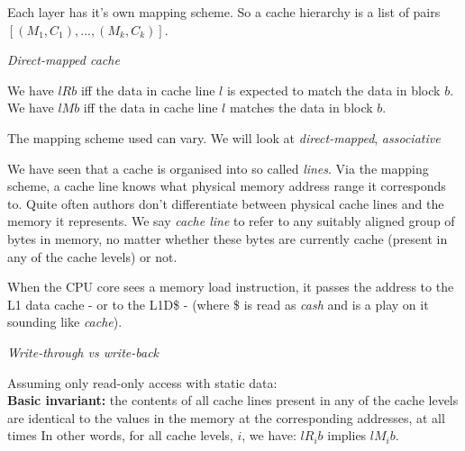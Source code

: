\frmrule

Each layer has it's own mapping scheme. So 
a cache hierarchy is a list of pairs 
$[(M_1, C_1), ..., (M_k, C_k)]$.

\frmrule

\textit{Direct-mapped cache}



We have $lRb$ iff the data in cache line $l$ is expected to match
the data in block $b$.
We have $lMb$ iff the data in cache line $l$ matches the data in 
block $b$.


\begin{figure}[h]
\end{figure} 

The mapping scheme used can vary. We will look at 
\textit{direct-mapped}, \textit{associative}

\frmrule

We have seen that a cache is organised into so called 
\textit{lines}. Via the mapping scheme, a cache line 
knows what physical memory address range it corresponds 
to. Quite often authors don't differentiate between
physical cache lines and the memory it represents. 
We say \textit{cache line} to refer to any suitably
aligned group of bytes in memory, no matter whether 
these bytes are currently cache (present in any of the
cache levels) or not.

When the CPU core sees a memory load instruction, it 
passes the address to the L1 data cache - or to the 
L1D\$ - (where \$ is read as \textit{cash} and is a play on 
it sounding like \textit{cache}).

\frmrule

\textit{Write-through vs write-back}

Assuming only read-only access with static data:\\
\textbf{Basic invariant:} the contents of all cache lines 
present in any of the cache levels are identical to the values 
in the memory at the corresponding addresses, at all times
In other words, for all cache levels, $i$, we have:
$l R_i b$ implies $l M_i b$.

